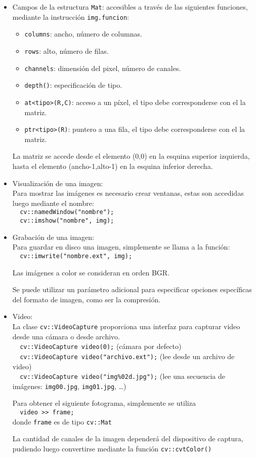 \documentclass[11pt,a4paper,onecolumn]
{article}
\newcommand{\tc}[1]{\texttt{#1}}
\begin{document}
\begin{itemize}
	\item Campos de la estructura \tc{Mat}: accesibles a través de las siguientes funciones, mediante la instrucción \tc{img.funcion}:
		\begin{itemize}
			\item \tc{columns}: ancho, número de columnas.
			\item \tc{rows}: alto, número de filas.
			\item \tc{channels}: dimensión del pixel, número de canales.
			\item \tc{depth()}: especificación de tipo.
			\item \tc{at<tipo>(R,C)}: acceso a un píxel, el tipo debe corresponderse con el la matriz.
			\item \tc{ptr<tipo>(R)}: puntero a una fila, el tipo debe corresponderse con el la matriz.
		\end{itemize}
		La matriz se accede desde el elemento (0,0) en la esquina superior izquierda, hasta el elemento (ancho-1,alto-1) en la esquina inferior derecha.

	\item Visualización de una imagen:\\
		Para mostrar las imágenes es necesario crear ventanas, estas son accedidas luego mediante el nombre:\\
		\verb|  cv::namedWindow("nombre");|\\
		\verb|  cv::imshow("nombre", img);|

	\item Grabación de una imagen:\\
		Para guardar en disco una imagen, simplemente se llama a la función:\\
		\verb|  cv::imwrite("nombre.ext", img);|

		Las imágenes a color se consideran en orden BGR.

		Se puede utilizar un parámetro adicional para especificar opciones específicas del formato de imagen, como ser la compresión.

	\item Video:\\
		La clase \tc{cv::VideoCapture} proporciona una interfaz para capturar video desde una cámara o desde archivo.\\
		\verb|  cv::VideoCapture video(0);| (cámara por defecto)\\
		\verb|  cv::VideoCapture video("archivo.ext");| (lee desde un archivo de video)\\
		\verb|  cv::VideoCapture video("img%02d.jpg");| (lee una secuencia de imágenes: \tc{img00.jpg}, \tc{img01.jpg}, \ldots)

		Para obtener el siguiente fotograma, simplemente se utiliza\\
		\verb|  video >> frame;|\\
		donde \tc{frame} es de tipo \tc{cv::Mat}

		La cantidad de canales de la imagen dependerá del dispositivo de captura, pudiendo luego convertirse mediante la función \tc{cv::cvtColor()}
\end{itemize}
\end{document}
